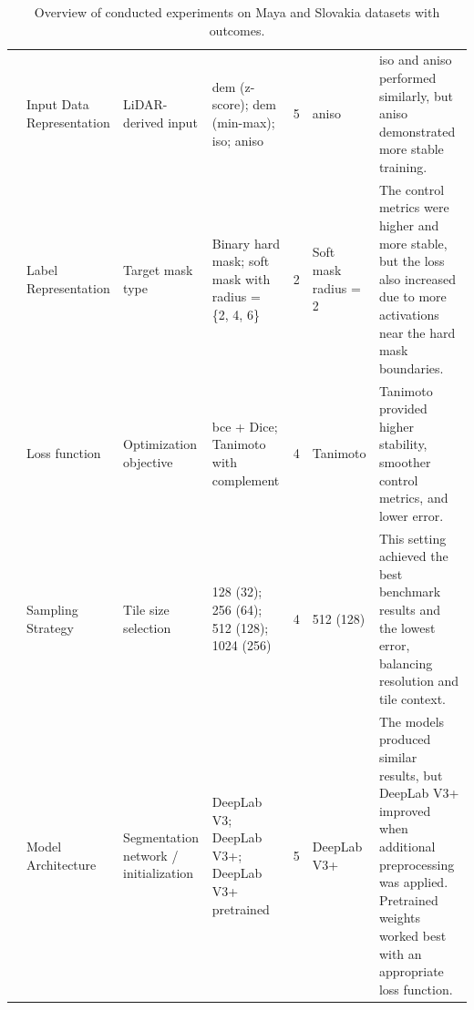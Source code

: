 \begin{landscape}
\begin{table}[p]
\begin{tabularx}{\linewidth}{
@{}
p{0.9cm}
p{2.6cm}
p{3.0cm}
p{4.4cm}
p{1.5cm}
p{3.0cm}
Y
@{}
}
\midrule

& Input Data Representation
& LiDAR-derived input
& \gls{dem} (z-score); \gls{dem} (min-max); \gls{iso}; \gls{aniso}
& 5
& \gls{aniso}
& \gls{iso} and \gls{aniso} performed similarly, but \gls{aniso} demonstrated more stable training. \\

& Label Representation
& Target mask type
& Binary hard mask; soft mask with radius = \{2, 4, 6\}
& 2
& Soft mask radius = 2
& The control metrics were higher and more stable, but the loss also increased due to more activations near the hard mask boundaries. \\

& Loss function
& Optimization objective
& \gls{bce} + Dice; Tanimoto with complement
& 4
& Tanimoto
& Tanimoto provided higher stability, smoother control metrics, and lower error. \\

& Sampling Strategy
& Tile size selection
& 128 (32); 256 (64); 512 (128); 1024 (256)
& 4
& 512 (128)
& This setting achieved the best benchmark results and the lowest error, balancing resolution and tile context. \\

& Model Architecture
& Segmentation network / initialization
& DeepLab V3; DeepLab V3+; DeepLab V3+ pretrained
& 5
& DeepLab V3+
& The models produced similar results, but DeepLab V3+ improved when additional preprocessing was applied. Pretrained weights worked best with an appropriate loss function. \\

\bottomrule
\end{tabularx}

\caption{Overview of conducted experiments on Maya and Slovakia datasets with outcomes.}
\label{app:tab:experiments_summary}
\end{table}
\end{landscape}

